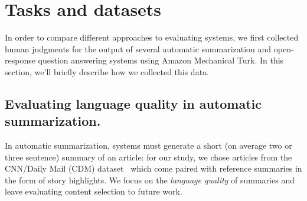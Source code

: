 \section{\label{sec:tasks} Tasks and datasets}

In order to compare different approaches to evaluating systems, we first collected human judgments for the output of several automatic summarization and open-response question answering systems using Amazon Mechanical Turk.
In this section, we'll briefly describe how we collected this data.

\subsection{Evaluating language quality in automatic summarization.}
In automatic summarization, systems must generate a short (on average two or three sentence) summary of an article: for our study, we chose articles from the CNN/Daily Mail (CDM) dataset~\citep{hermann2015read,nallapati2016abstractive} which come paired with reference summaries in the form of story highlights.
We focus on the \textit{language quality} of summaries and leave evaluating content selection to future work.

